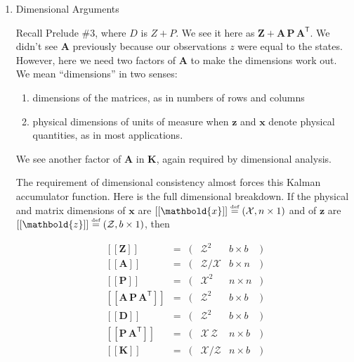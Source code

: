 \documentclass[10pt,oneside,x11names]{article}
\begin{document}
\begin{enumerate}
\item Dimensional Arguments
\label{sec:orgheadline13}

\noindent Recall Prelude \#3, where \(D\) is \(Z+P\). We see it here as
\(\mathbold{Z}+\mathbold{A}\,\mathbold{P}\,\mathbold{A}^{\mathsf{T}}\). We didn't see
\(\mathbold{A}\) previously because our observations \(z\) were equal to the
states. However, here we need two factors of
\(\mathbold{A}\) to make the dimensions work out. We mean ``dimensions'' in two
senses:

\begin{enumerate}
\item dimensions of the matrices, as in numbers of rows and columns
\item physical dimensions of units of measure when \(\mathbold{z}\) and
\(\mathbold{x}\) denote physical quantities, as in most applications.
\end{enumerate}

We see another factor of
\(\mathbold{A}\) in  \(\mathbold{K}\), again required by
dimensional analysis.

The requirement of dimensional consistency almost forces this Kalman
accumulator function.
Here is the full dimensional breakdown. If the physical and matrix dimensions of
\(\mathbold{x}\)
are
\(\left[\left[\mathbold{x}\right]\right]
\stackrel{\text{\tiny def}}{=}
(\mathcal{X}, n\times{1})\)
and of
\(\mathbold{z}\)
are
\(\left[\left[\mathbold{z}\right]\right]
\stackrel{\text{\tiny def}}{=}
(\mathcal{Z}, b\times{1})\), then

\begin{equation}
\label{eqn:dimensional-breakdown}
\begin{array}{lccccr}
\left[\left[\mathbold{Z}\right]\right]                                       &=& (&\mathcal{Z}^2            & b\times{b}&) \\
\left[\left[\mathbold{A}\right]\right]                                       &=& (&\mathcal{Z}/\mathcal{X}  & b\times{n}&) \\
\left[\left[\mathbold{P}\right]\right]                                       &=& (&\mathcal{X}^2            & n\times{n}&) \\
\left[\left[\mathbold{A}\,\mathbold{P}\,\mathbold{A}^{\mathsf{T}}\right]\right] &=& (&\mathcal{Z}^2            & b\times{b}&) \\
\left[\left[\mathbold{D}\right]\right]                                       &=& (&\mathcal{Z}^2            & b\times{b}&) \\
\left[\left[\mathbold{P}\,\mathbold{A}^{\mathsf{T}}\right]\right]               &=& (&\mathcal{X}\,\mathcal{Z} & n\times{b}&) \\
\left[\left[\mathbold{K}\right]\right]                                       &=& (&\mathcal{X}/\mathcal{Z}  & n\times{b}&)
\end{array}
\end{equation}


\end{enumerate}
\end{document}
